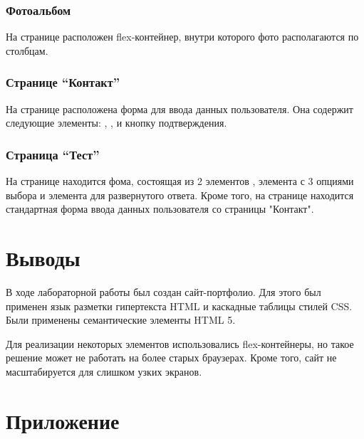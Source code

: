 \documentclass[a4paper,14pt]{extarticle}
\begin{document}
\subsubsection{Фотоальбом}
На странице расположен flex-контейнер, внутри которого фото
располагаются по столбцам.

\subsubsection{Странице \enquote{Контакт}}
На странице расположена форма для ввода данных пользователя.
Она содержит следующие элементы: , 
,  и кнопку подтверждения.

\subsubsection{Страница \enquote{Тест}}
На странице находится фома, состоящая из 2 элементов ,
элемента  с 3 опциями выбора и элемента 
для развернутого ответа. Кроме того, на странице находится стандартная
форма ввода данных пользователя со страницы "Контакт".

\section*{Выводы}
В ходе лабораторной работы был создан сайт-портфолио. Для этого
был применен язык разметки гипертекста HTML и каскадные таблицы
стилей CSS. Были применены семантические элементы HTML 5.

Для реализации некоторых элементов использовались flex-контейнеры,
но такое решение может не работать на более старых браузерах.
Кроме того, сайт не масштабируется для слишком узких экранов.
\section*{Приложение}

\end{document}
